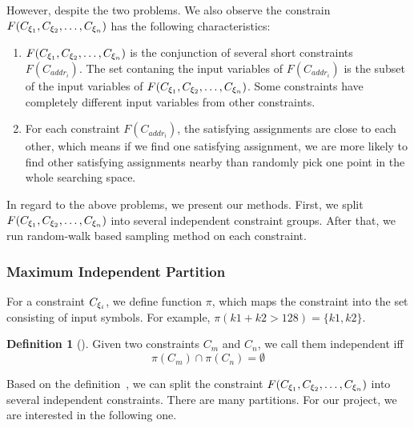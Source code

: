 However, despite the two problems. We also observe the constrain $F(C_{{\xi}_{1}},C_{{\xi}_{2}},\ldots,C_{{\xi}_{n}})$
has the following characteristics:
\begin{enumerate}
      \item $F(C_{{\xi}_{1}},C_{{\xi}_{2}},\ldots,C_{{\xi}_{n}})$ is the conjunction of several
      short constraints $F(C_{{addr}_i})$. The set contaning the input variables of 
      $F(C_{{addr}_i})$ is the subset of the input variables of $F(C_{{\xi}_{1}},C_{{\xi}_{2}},\ldots,C_{{\xi}_{n}})$.
      Some constraints have completely different input variables from other constraints.
      \item For each constraint $F(C_{{addr}_i})$, the satisfying assignments
      are close to each other, which means if we find one satisfying assignment, we 
      are more likely to find other satisfying assignments nearby than randomly
      pick one point in the whole searching space.
      
\end{enumerate}

In regard to the above problems, we present our methods. First, we split 
$F(C_{{\xi}_{1}},C_{{\xi}_{2}},\ldots,C_{{\xi}_{n}})$ into several independent constraint groups. After
that, we run random-walk based sampling method on each constraint.

\subsubsection{Maximum Independent Partition}

For a constraint $C_{{\xi}_{i}}$, we define function $\pi$, which maps
the constraint into the set consisting of input symbols. For example, 
$\pi(k1 + k2 > 128) = \{k1, k2\}$.

\theoremstyle{definition}
\newtheorem{definition}{Definition}[section]

\begin{definition}[]
      \label{independentC}
      Given two constraints $C_m$ and $C_n$, we call them independent iff 
      $$\pi(C_m) \cap \pi(C_n) = \emptyset$$
\end{definition}

Based on the definition~\label{independentC}, we can split
the constraint $F(C_{{\xi}_{1}},C_{{\xi}_{2}},\ldots,C_{{\xi}_{n}})$ into several 
independent constraints. There are many partitions. For our project, 
we are interested in the following one.

